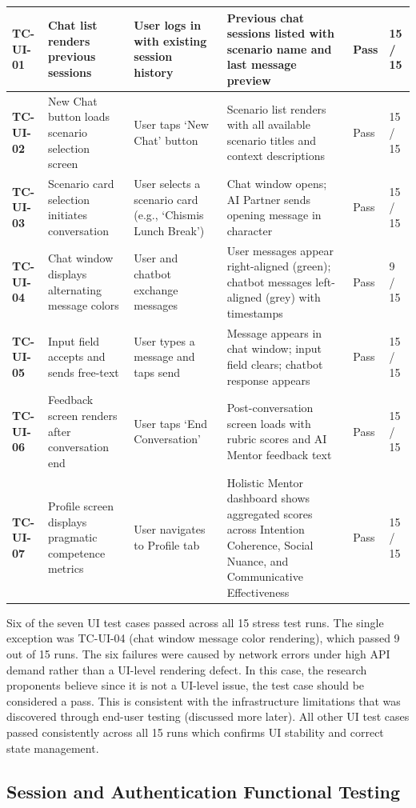 \begin{longtable}{>{\bfseries}p{1.2cm} p{3.0cm} p{3.5cm} p{4.5cm} p{1.0cm} p{1.5cm}}
\midrule
TC-UI-01 & Chat list renders previous sessions & User logs in with existing session history & Previous chat sessions listed with scenario name and last message preview & Pass & 15 / 15 \\
\midrule
TC-UI-02 & New Chat button loads scenario selection screen & User taps `New Chat' button & Scenario list renders with all available scenario titles and context descriptions & Pass & 15 / 15 \\
\midrule
TC-UI-03 & Scenario card selection initiates conversation & User selects a scenario card (e.g., `Chismis Lunch Break') & Chat window opens; AI Partner sends opening message in character & Pass & 15 / 15 \\
\midrule
TC-UI-04 & Chat window displays alternating message colors & User and chatbot exchange messages & User messages appear right-aligned (green); chatbot messages left-aligned (grey) with timestamps & Pass & 9 / 15 \\
\midrule
TC-UI-05 & Input field accepts and sends free-text & User types a message and taps send & Message appears in chat window; input field clears; chatbot response appears & Pass & 15 / 15 \\
\midrule
TC-UI-06 & Feedback screen renders after conversation end & User taps `End Conversation' & Post-conversation screen loads with rubric scores and AI Mentor feedback text & Pass & 15 / 15 \\
\midrule
TC-UI-07 & Profile screen displays pragmatic competence metrics & User navigates to Profile tab & Holistic Mentor dashboard shows aggregated scores across Intention Coherence, Social Nuance, and Communicative Effectiveness & Pass & 15 / 15 \\
\end{longtable}
 
\noindent Six of the seven UI test cases passed across all 15 stress test runs. The single exception was TC-UI-04 (chat window message color rendering), which passed 9 out of 15 runs. The six failures were caused by network errors under high API demand rather than a UI-level rendering defect. In this case, the 
research proponents believe since it is not a UI-level issue, the test case should be considered a pass. This is consistent with the infrastructure limitations that was discovered through end-user testing (discussed more later). All other UI test cases passed consistently across all 15 runs which confirms UI stability and correct state management.
 
\subsection{Session and Authentication Functional Testing}
 
